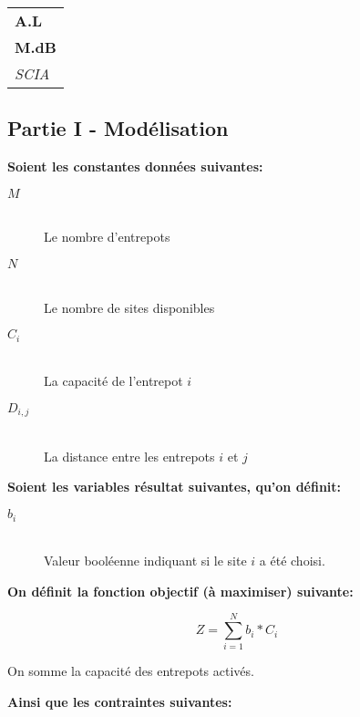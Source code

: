 \documentclass[a4paper]{article}
\begin{document}

\null\hfill\begin{tabular}[t]{l@{}}
  \textbf{A.L} \\
  \textbf{M.dB} \\
  \textit{SCIA}
\end{tabular}

\vspace{1cm}

\noindent{}

\vspace{1cm}


\subsection*{Partie I - Modélisation}

\textbf{Soient les constantes données suivantes:}

\begin{description}
    \item[$M$] \hfill \\
        Le nombre d'entrepots
    \item[$N$] \hfill \\
        Le nombre de sites disponibles
    \item[$C_{i}$] \hfill \\
        La capacité de l'entrepot $i$
    \item[$D_{i, j}$] \hfill \\
        La distance entre les entrepots $i$ et $j$
\end{description}

\textbf{Soient les variables résultat suivantes, qu'on définit:}

\begin{description}
    \item[$b_{i}$] \hfill \\
        Valeur booléenne indiquant si le site $i$ a été choisi.
\end{description}

\textbf{On définit la fonction objectif (à maximiser) suivante:}

$$
Z = \sum\limits_{i = 1}^{N}b_{i} * C_{i}
$$

On somme la capacité des entrepots activés.

\textbf{Ainsi que les contraintes suivantes:}
\end{document}
